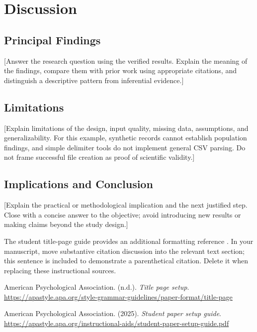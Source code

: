 \documentclass[12pt,letterpaper]{article}
\begin{document}
\section{Discussion}
\subsection{Principal Findings}
[Answer the research question using the verified results. Explain the meaning
of the findings, compare them with prior work using appropriate citations,
and distinguish a descriptive pattern from inferential evidence.]

\subsection{Limitations}
[Explain limitations of the design, input quality, missing data, assumptions,
and generalizability. For this example, synthetic records cannot establish
population findings, and simple delimiter tools do not implement general CSV
parsing. Do not frame successful file creation as proof of scientific validity.]

\subsection{Implications and Conclusion}
[Explain the practical or methodological implication and the next justified
step. Close with a concise answer to the objective; avoid introducing new
results or making claims beyond the study design.]

The student title-page guide provides an additional formatting reference
\citep{apa-title}. In your manuscript, move substantive citation discussion
into the relevant text section; this sentence is included to demonstrate a
parenthetical citation. Delete it when replacing these instructional sources.
\newpage
\begin{thebibliography}{}
American Psychological Association. (n.d.).
\textit{Title page setup}.
\url{https://apastyle.apa.org/style-grammar-guidelines/paper-format/title-page}

American Psychological Association. (2025).
\textit{Student paper setup guide}.
\url{https://apastyle.apa.org/instructional-aids/student-paper-setup-guide.pdf}
\end{thebibliography}
\end{document}
